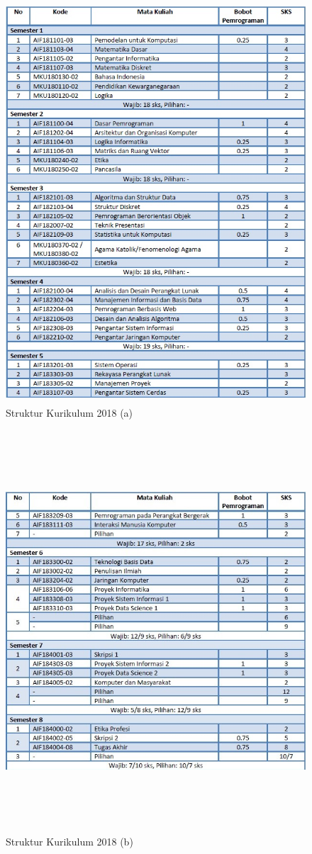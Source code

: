 \begin{figure}[H]
    \centering
    \includegraphics[width=12cm, height=15cm]{Gambar/Struktur Kurikulum 1.jpg}
    \caption{Struktur Kurikulum 2018 (a)}
    \label{fig:gambar6}
\end{figure}

\begin{figure}[H]
    \centering
    \includegraphics[width=12cm, height=15cm]{Gambar/Struktur Kurikulum 2.jpg}
    \caption{Struktur Kurikulum 2018 (b)}
    \label{fig:gambar7}
\end{figure}

